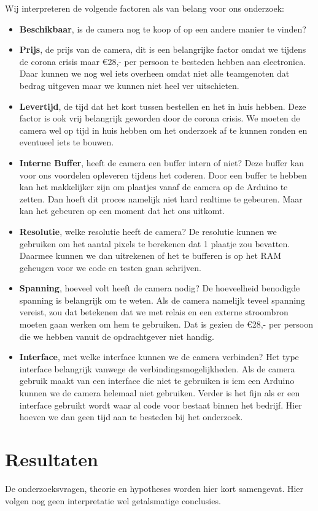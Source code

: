 \documentclass{article}
\begin{document}
Wij interpreteren de volgende factoren als van belang voor ons onderzoek:
\begin{itemize}
	\item \textbf{Beschikbaar}, is de camera nog te koop of op een andere manier te vinden?
	\item \textbf{Prijs}, de prijs van de camera, dit is een belangrijke factor omdat we tijdens de corona crisis maar €28,- per persoon te besteden hebben aan electronica. Daar kunnen we nog wel iets overheen omdat niet alle teamgenoten dat bedrag uitgeven maar we kunnen niet heel ver uitschieten.
	\item \textbf{Levertijd}, de tijd dat het kost tussen bestellen en het in huis hebben. Deze factor is ook vrij belangrijk geworden door de corona crisis. We moeten de camera wel op tijd in huis hebben om het onderzoek af te kunnen ronden en eventueel iets te bouwen.
	\item \textbf{Interne Buffer}, heeft de camera een buffer intern of niet? Deze buffer kan voor ons voordelen opleveren tijdens het coderen. Door een buffer te hebben kan het makkelijker zijn om plaatjes vanaf de camera op de Arduino te zetten. Dan hoeft dit proces namelijk niet hard realtime te gebeuren. Maar kan het gebeuren op een moment dat het ons uitkomt.
	\item \textbf{Resolutie}, welke resolutie heeft de camera? De resolutie kunnen we gebruiken om het aantal pixels te berekenen dat 1 plaatje zou bevatten. Daarmee kunnen we dan uitrekenen of het te bufferen is op het RAM geheugen voor we code en testen gaan schrijven.
	\item \textbf{Spanning}, hoeveel volt heeft de camera nodig? De hoeveelheid benodigde spanning is belangrijk om te weten. Als de camera namelijk teveel spanning vereist, zou dat betekenen dat we met relais en een externe stroombron moeten gaan werken om hem te gebruiken. Dat is gezien de €28,- per persoon die we hebben vanuit de opdrachtgever niet handig.
	\item \textbf{Interface}, met welke interface kunnen we de camera verbinden? Het type interface belangrijk vanwege de verbindingsmogelijkheden. Als de camera gebruik maakt van een interface die niet te gebruiken is icm een Arduino kunnen we de camera helemaal niet gebruiken. Verder is het fijn als er een interface gebruikt wordt waar al code voor bestaat binnen het bedrijf. Hier hoeven we dan geen tijd aan te besteden bij het onderzoek.
\end{itemize}


\section{Resultaten}
De onderzoeksvragen, theorie en hypotheses worden hier kort samengevat. Hier volgen nog geen interpretatie wel getalsmatige conclusies.
\end{document}
